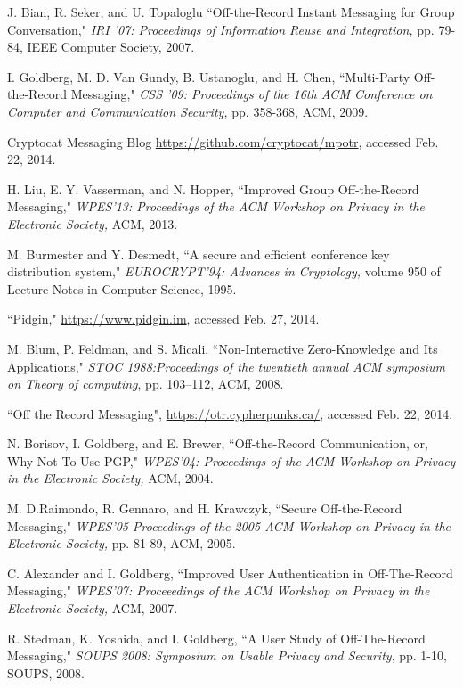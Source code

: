 \documentclass[%
preprint,
amsmath,amssymb,
aps,
prb,
floatfix,
]{revtex4-1}
\begin{document}
\begin{thebibliography}{99}
 J. Bian, R. Seker, and U. Topaloglu ``Off-the-Record Instant
Messaging for Group Conversation," \textit{IRI '07: Proceedings of Information
Reuse and Integration,} pp. 79-84, IEEE Computer Society, 2007.

 I. Goldberg, M. D. Van Gundy, B. Ustanoglu, and H. Chen,
``Multi-Party Off-the-Record Messaging," \textit{CSS '09: Proceedings of the
16th ACM Conference on Computer and Communication Security,} pp. 358-368, ACM,
2009.

 Cryptocat Messaging Blog
\url{https://github.com/cryptocat/mpotr}, accessed Feb. 22, 2014.

 H. Liu, E. Y. Vasserman, and N. Hopper, ``Improved Group
Off-the-Record Messaging," \textit{WPES'13: Proceedings of the ACM Workshop on
Privacy in the Electronic Society,} ACM, 2013.

 M. Burmester and Y. Desmedt, ``A secure and efficient
conference key distribution system," \textit{EUROCRYPT'94: Advances in
Cryptology,} volume 950 of Lecture Notes in Computer Science, 1995.

 ``Pidgin," \url{https://www.pidgin.im}, accessed Feb. 27,
2014.

 M. Blum, P. Feldman, and S. Micali, ``Non-Interactive
Zero-Knowledge and Its Applications," \textit{ STOC 1988:Proceedings of the
twentieth annual ACM symposium on Theory of computing}, pp. 103–112, ACM, 2008.

 ``Off the Record Messaging",
\url{https://otr.cypherpunks.ca/}, accessed Feb. 22, 2014.

 N. Borisov, I. Goldberg, and E. Brewer, ``Off-the-Record
Communication, or, Why Not To Use PGP," \textit{WPES'04: Proceedings of the
ACM Workshop on Privacy in the Electronic Society,} ACM, 2004.

 M. D.Raimondo, R. Gennaro, and H. Krawczyk, ``Secure
Off-the-Record Messaging," \textit{WPES'05 Proceedings of the 2005 ACM Workshop
on Privacy in the Electronic Society,} pp. 81-89, ACM, 2005.

 C. Alexander and I. Goldberg, ``Improved User Authentication
in Off-The-Record Messaging," \textit{WPES'07: Proceeedings of the ACM Workshop
on Privacy in the Electronic Society,} ACM, 2007.

 R. Stedman, K. Yoshida, and I. Goldberg, ``A User Study of
Off-The-Record Messaging," \textit{SOUPS 2008: Symposium on Usable Privacy and
Security}, pp. 1-10, SOUPS, 2008.


\end{thebibliography}
\end{document}
